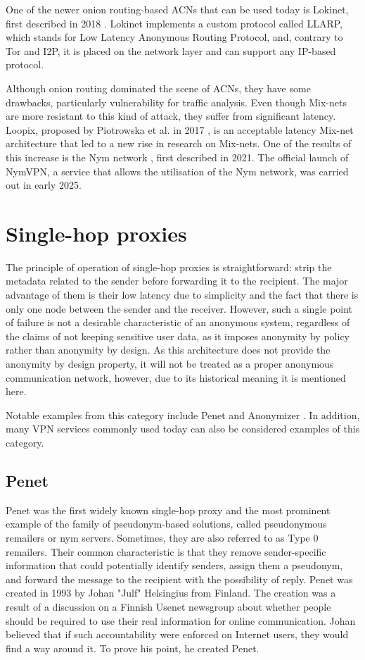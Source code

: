One of the newer onion routing-based ACNs that can be used today is Lokinet, first described in 2018 \cite{loki}. Lokinet implements a custom protocol called LLARP, which stands for Low Latency Anonymous Routing Protocol, and, contrary to Tor and I2P, it is placed on the network layer and can support any IP-based protocol.

Although onion routing dominated the scene of ACNs, they have some drawbacks, particularly vulnerability for traffic analysis. Even though Mix-nets are more resistant to this kind of attack, they suffer from significant latency. Loopix, proposed by Piotrowska et al. in 2017 \cite{loopix}, is an acceptable latency Mix-net architecture that led to a new rise in research on Mix-nets. One of the results of this increase is the Nym network \cite{nym}, first described in 2021. The official launch of NymVPN, a service that allows the utilisation of the Nym network, was carried out in early 2025.

\section{Single-hop proxies}
The principle of operation of single-hop proxies is straightforward: strip the metadata related to the sender before forwarding it to the recipient. The major advantage of them is their low latency due to simplicity and the fact that there is only one node between the sender and the receiver. However, such a single point of failure is not a desirable characteristic of an anonymous system, regardless of the claims of not keeping sensitive user data, as it imposes anonymity by policy rather than anonymity by design. As this architecture does not provide the anonymity by design property, it will not be treated as a proper anonymous communication network, however, due to its historical meaning it is mentioned here.

Notable examples from this category include Penet \cite{penet} and Anonymizer \cite{anonymizer}. In addition, many VPN services commonly used today can also be considered examples of this category.

\subsection{Penet}
Penet was the first widely known single-hop proxy and the most prominent example of the family of pseudonym-based solutions, called pseudonymous remailers or nym servers. Sometimes, they are also referred to as Type 0 remailers. Their common characteristic is that they remove sender-specific information that could potentially identify senders, assign them a pseudonym, and forward the message to the recipient with the possibility of reply. Penet was created in 1993 by Johan "Julf" Helsingius from Finland. The creation was a result of a discussion on a Finnish Usenet newsgroup about whether people should be required to use their real information for online communication. Johan believed that if such accountability were enforced on Internet users, they would find a way around it. To prove his point, he created Penet.

